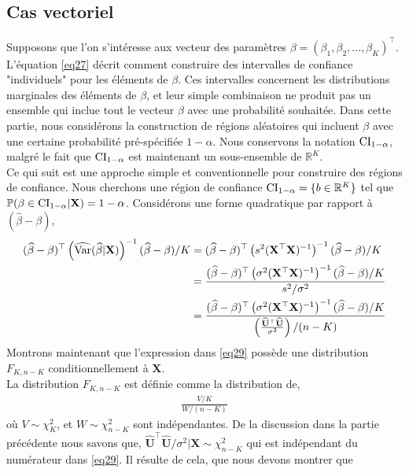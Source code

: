 \subsection{Cas vectoriel}
Supposons que l'on s'intéresse aux vecteur des paramètres $\beta =(\beta_1,\beta_2,...,\beta_K)^\top$. L'équation \eqref{eq27} décrit comment construire des intervalles de confiance "individuels" pour les éléments de $\beta$. Ces intervalles concernent les distributions marginales des éléments de $\beta$, et leur simple combinaison ne produit pas un ensemble qui inclue tout le vecteur $\beta$ avec une probabilité souhaitée. Dans cette partie, nous considérons la construction de régions aléatoires qui incluent $\beta$ avec une certaine probabilité pré-spécifiée $1-\alpha$. Nous conservons la notation $\mathrm{CI}_{1-\alpha}$, malgré le fait que  $\mathrm{CI}_{1-\alpha}$ est maintenant un sous-ensemble de $\mathbb{R}^K$.\\
Ce qui suit est une approche simple et conventionnelle pour construire des régions de confiance. Nous cherchons une région de confiance $\mathrm{CI}_{1-\alpha} = \{b \in \mathbb{R}^K\}$ tel que ${\mathbb{P}}(\beta \in \mathrm{CI}_{1-\alpha} | \mathbf{X})=1-\alpha$. Considérons une forme quadratique par rapport à $(\widehat{\beta}-\beta)$,
\begin{align}
(\widehat{\beta}-\beta)^\top\left(\widehat{\mathrm{Var}}(\widehat{\beta}|\mathbf{X})\right)^{-1}(\widehat{\beta}-\beta)/K &=
(\widehat{\beta}-\beta)^\top\left(s^2(\mathbf{X}^\top\mathbf{X})^{-1}
\right)^{-1}
(\widehat{\beta}-\beta)/K \nonumber\\
&=\frac{
(\widehat{\beta}-\beta)^\top\left(\sigma^2(\mathbf{X}^\top\mathbf{X})^{-1}
\right)^{-1}
(\widehat{\beta}-\beta)/K}
{s^2/\sigma^2}\nonumber\\
&=\frac{
(\widehat{\beta}-\beta)^\top\left(\sigma^2(\mathbf{X}^\top\mathbf{X})^{-1}
\right)^{-1}
(\widehat{\beta}-\beta)/K}
{\left(\frac{\widehat{\mathbf{U}}^\top\widehat{\mathbf{U}}}{\sigma^2}\right)/(n-K)}
\label{eq29}
\end{align}
Montrons maintenant que l'expression dans \eqref{eq29} possède une distribution $F_{K,n-K}$ conditionnellement à $\mathbf{X}$.\\
La distribution $F_{K,n-K}$ est définie comme la distribution de,
\begin{align*}
\frac{V/K}{W/(n-K)}
\end{align*}
où $V \sim \chi^2_K$, et $W\sim\chi^2_{n-K}$ sont indépendantes. De la discussion dans la partie précédente nous savons que, $\widehat{\mathbf{U}}^\top\widehat{\mathbf{U}}/\sigma^2|\mathbf{X}\sim\chi^2_{n-K}$ qui est indépendant du numérateur dans \eqref{eq29}. Il résulte de cela, que nous devons montrer que 
